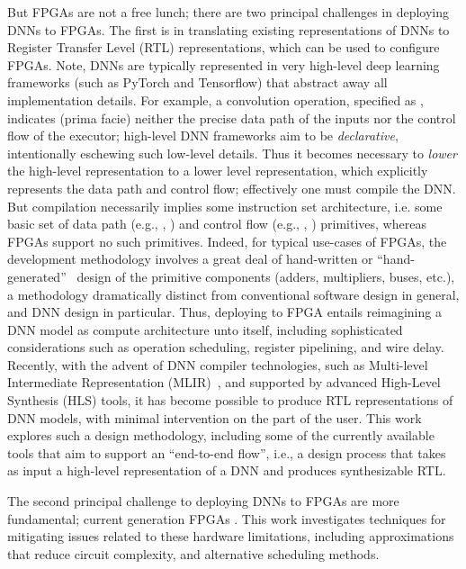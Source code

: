 But FPGAs are not a free lunch; there are two principal challenges in deploying DNNs to FPGAs.
The first is in translating existing representations of DNNs to Register Transfer Level (RTL) representations, which can be used to configure FPGAs.
Note, DNNs are typically represented in very high-level deep learning frameworks (such as PyTorch and Tensorflow) that abstract away all implementation details. 
For example, a convolution operation, specified as , indicates (prima facie) neither the precise data path of the inputs nor the control flow of the executor; high-level DNN frameworks aim to be \emph{declarative}, intentionally eschewing such low-level details.
Thus it becomes necessary to \emph{lower} the high-level representation to a lower level representation, which explicitly represents the data path and control flow; effectively one must compile the DNN.
But compilation necessarily implies some instruction set architecture, i.e. some basic set of data path (e.g., , ) and control flow (e.g., , ) primitives,
whereas FPGAs support no such primitives.
Indeed, for typical use-cases of FPGAs, the development methodology involves a great deal of hand-written or ``hand-generated''~\cite{nikhil2004bluespec} design of the primitive components (adders, multipliers, buses, etc.), a methodology dramatically distinct from conventional software design in general, and DNN design in particular.
Thus, deploying to FPGA entails reimagining a DNN model as compute architecture unto itself, including sophisticated considerations such as operation scheduling, register pipelining, and wire delay.
Recently, with the advent of DNN compiler technologies, such as Multi-level Intermediate Representation (MLIR)~\cite{https://doi.org/10.48550/arxiv.2002.11054}, and supported by advanced High-Level Synthesis (HLS) tools, it has become possible to produce RTL representations of DNN models, with minimal intervention on the part of the user.
This work explores such a design methodology, including some of the currently available tools that aim to support an ``end-to-end flow'', i.e., a design process that takes as input a high-level representation of a DNN and produces synthesizable RTL.

The second principal challenge to deploying DNNs to FPGAs are more fundamental; current generation FPGAs .
This work investigates techniques for mitigating issues related to these hardware limitations, including approximations that reduce circuit complexity, and alternative scheduling methods. 


